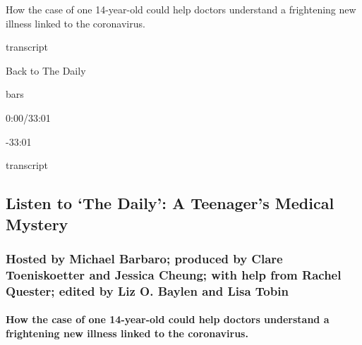 How the case of one 14-year-old could help doctors understand a
frightening new illness linked to the coronavirus.

transcript

Back to The Daily

bars

0:00/33:01

-33:01

transcript

\hypertarget{listen-to-the-daily-a-teenagers-medical-mystery-1}{%
\subsection{Listen to `The Daily': A Teenager's Medical
Mystery}\label{listen-to-the-daily-a-teenagers-medical-mystery-1}}

\hypertarget{hosted-by-michael-barbaro-produced-by-clare-toeniskoetter-and-jessica-cheung-with-help-from-rachel-quester-edited-by-liz-o-baylen-and-lisa-tobin}{%
\subsubsection{Hosted by Michael Barbaro; produced by Clare
Toeniskoetter and Jessica Cheung; with help from Rachel Quester; edited
by Liz O. Baylen and Lisa
Tobin}\label{hosted-by-michael-barbaro-produced-by-clare-toeniskoetter-and-jessica-cheung-with-help-from-rachel-quester-edited-by-liz-o-baylen-and-lisa-tobin}}

\hypertarget{how-the-case-of-one-14-year-old-could-help-doctors-understand-a-frightening-new-illness-linked-to-the-coronavirus}{%
\paragraph{How the case of one 14-year-old could help doctors understand
a frightening new illness linked to the
coronavirus.}\label{how-the-case-of-one-14-year-old-could-help-doctors-understand-a-frightening-new-illness-linked-to-the-coronavirus}}

